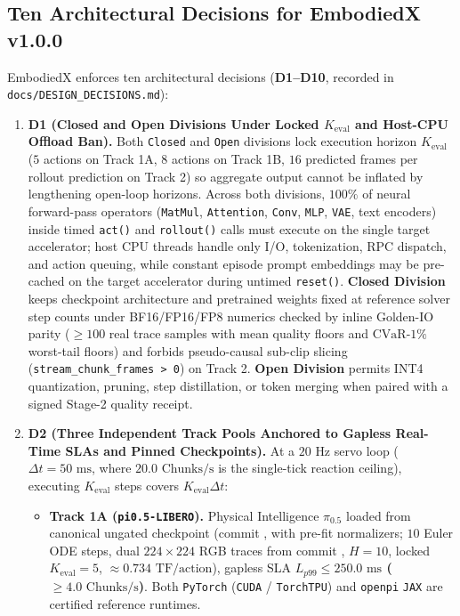 \documentclass[10pt,letterpaper]{article}
\begin{document}
\subsection{Ten Architectural Decisions for EmbodiedX v1.0.0}

EmbodiedX enforces ten architectural decisions (\textbf{D1--D10}, recorded in \texttt{docs/DESIGN\_DECISIONS.md}):
\begin{enumerate}
    \item \textbf{D1 (Closed and Open Divisions Under Locked $K_{\text{eval}}$ and Host-CPU Offload Ban).} Both \texttt{Closed} and \texttt{Open} divisions lock execution horizon $K_{\text{eval}}$ ($5$ actions on Track 1A, $8$ actions on Track 1B, $16$ predicted frames per rollout prediction on Track 2) so aggregate output cannot be inflated by lengthening open-loop horizons. Across both divisions, $100\%$ of neural forward-pass operators (\texttt{MatMul}, \texttt{Attention}, \texttt{Conv}, \texttt{MLP}, \texttt{VAE}, text encoders) inside timed \texttt{act()} and \texttt{rollout()} calls must execute on the single target accelerator; host CPU threads handle only I/O, tokenization, RPC dispatch, and action queuing, while constant episode prompt embeddings may be pre-cached on the target accelerator during untimed \texttt{reset()}. \textbf{Closed Division} keeps checkpoint architecture and pretrained weights fixed at reference solver step counts under BF16/FP16/FP8 numerics checked by inline Golden-IO parity ($\ge 100$ real trace samples with mean quality floors and $\text{CVaR-1\%}$ worst-tail floors) and forbids pseudo-causal sub-clip slicing (\texttt{stream\_chunk\_frames > 0}) on Track 2. \textbf{Open Division} permits INT4 quantization, pruning, step distillation, or token merging when paired with a signed Stage-2 quality receipt.
    \item \textbf{D2 (Three Independent Track Pools Anchored to Gapless Real-Time SLAs and Pinned Checkpoints).} At a $20\text{ Hz}$ servo loop ($\Delta t = 50\text{ ms}$, where $20.0\text{ Chunks/s}$ is the single-tick reaction ceiling), executing $K_{\text{eval}}$ steps covers $K_{\text{eval}}\Delta t$:
    \begin{itemize}
        \item \textbf{Track 1A (\texttt{pi0.5-LIBERO}).} Physical Intelligence $\pi_{0.5}$ \cite{PhysicalIntelligence2025pi05} loaded from canonical ungated checkpoint  (commit , with pre-fit normalizers; $10$ Euler ODE steps, dual $224\times 224$ RGB traces from  commit , $H = 10$, locked $K_{\text{eval}} = 5$, $\approx 0.734\text{ TF/action}$), gapless SLA \textbf{$L_{p99} \le 250.0\text{ ms}$ ($\ge 4.0\text{ Chunks/s}$)}. Both \texttt{PyTorch} (\texttt{CUDA} / \texttt{TorchTPU}) and \texttt{openpi} \texttt{JAX} are certified reference runtimes.

\end{itemize}
\end{enumerate}
\end{document}
